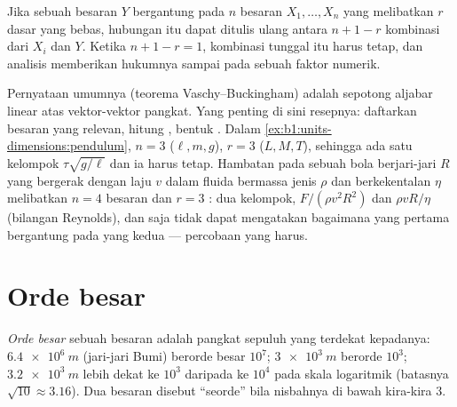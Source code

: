 \begin{proposition}\label{prop:b1:units-dimensions:pi}
Jika sebuah besaran $Y$ bergantung pada $n$ besaran $X_1, \dots, X_n$
yang melibatkan $r$  dasar yang bebas, hubungan itu dapat ditulis
ulang antara $n + 1 - r$ kombinasi  dari $X_i$ dan $Y$.
Ketika $n + 1 - r = 1$, kombinasi tunggal itu harus tetap, dan analisis
 memberikan hukumnya sampai pada sebuah faktor numerik.
\end{proposition}
\admitted

\begin{remark}\label{rem:b1:units-dimensions:pi}
Pernyataan umumnya (teorema Vaschy--Buckingham) adalah sepotong aljabar
linear atas vektor-vektor pangkat. Yang penting di sini resepnya:
daftarkan besaran yang relevan, hitung , bentuk . Dalam \cref{ex:b1:units-dimensions:pendulum}, $n = 3$
($\ell, m, g$), $r = 3$ ($L, M, T$), sehingga ada satu kelompok
$\tau\sqrt{g/\ell}$ dan ia harus tetap. Hambatan pada sebuah bola
berjari-jari $R$ yang bergerak dengan laju $v$ dalam fluida bermassa
jenis $\rho$ dan berkekentalan $\eta$ melibatkan $n = 4$ besaran dan
$r = 3$ : dua kelompok, $F/(\rho v^2 R^2)$ dan $\rho v R/\eta$
(bilangan Reynolds), dan  saja tidak dapat mengatakan bagaimana
yang pertama bergantung pada yang kedua --- percobaan yang harus.
\end{remark}

\section{Orde besar}

\begin{definition}\label{def:b1:units-dimensions:oom}
\emph{Orde besar} sebuah besaran adalah pangkat sepuluh yang terdekat
kepadanya: $\qty{6.4e6}{m}$ (jari-jari Bumi) berorde besar
$10^7$; $\qty{3e3}{m}$ berorde $10^3$; $\qty{3.2e3}{m}$ lebih dekat ke
$10^3$ daripada ke $10^4$ pada skala logaritmik (batasnya
$\sqrt{10} \approx 3.16$). Dua besaran disebut ``seorde'' bila
nisbahnya di bawah kira-kira $3$.
\end{definition}

